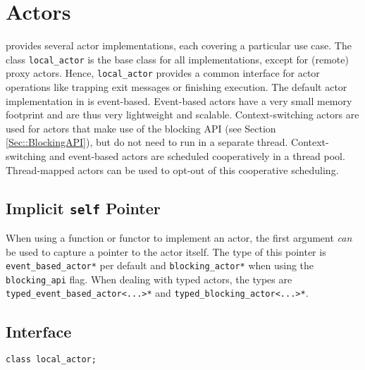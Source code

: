 \section{Actors}

\lib provides several actor implementations, each covering a particular use case.
The class \lstinline^local_actor^ is the base class for all implementations, except for (remote) proxy actors.
Hence, \lstinline^local_actor^ provides a common interface for actor operations like trapping exit messages or finishing execution.
The default actor implementation in \lib is event-based.
Event-based actors have a very small memory footprint and are thus very lightweight and scalable.
Context-switching actors are used for actors that make use of the blocking API (see Section \ref{Sec::BlockingAPI}), but do not need to run in a separate thread.
Context-switching and event-based actors are scheduled cooperatively in a thread pool.
Thread-mapped actors can be used to opt-out of this cooperative scheduling.

\subsection{Implicit \texttt{self} Pointer}

When using a function or functor to implement an actor, the first argument \emph{can} be used to capture a pointer to the actor itself.
The type of this pointer is \lstinline^event_based_actor*^ per default and \lstinline^blocking_actor*^ when using the \lstinline^blocking_api^ flag.
When dealing with typed actors, the types are \lstinline^typed_event_based_actor<...>*^ and \lstinline^typed_blocking_actor<...>*^.

\clearpage
\subsection{Interface}

\begin{lstlisting}
class local_actor;
\end{lstlisting}

